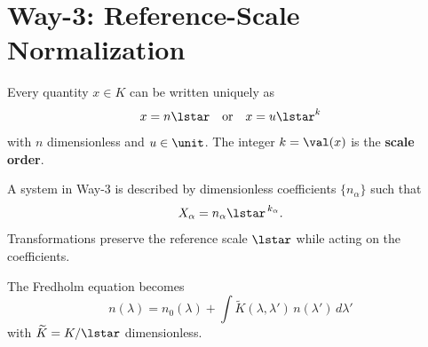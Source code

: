 \section{Way-3: Reference-Scale Normalization}

\begin{definition}
Every quantity $x \in K$ can be written uniquely as
\[
x = n\lstar \quad \text{or} \quad x = u\lstar^{k}
\]
with $n$ dimensionless and $u \in \unit$. The integer $k = \val(x)$ is the \textbf{scale order}.
\end{definition}

\begin{definition}
A system in Way-3 is described by dimensionless coefficients $\{n_{\alpha}\}$ such that
\[
X_{\alpha} = n_{\alpha}\lstar^{\,k_{\alpha}}.
\]
Transformations preserve the reference scale $\lstar$ while acting on the coefficients.
\end{definition}

\begin{example}
The Fredholm equation becomes
\[
n(\lambda) = n_0(\lambda) + \int \widetilde{K}(\lambda,\lambda')\, n(\lambda')\, d\lambda'
\]
with $\widetilde{K} = K/\lstar$ dimensionless.
\end{example}

